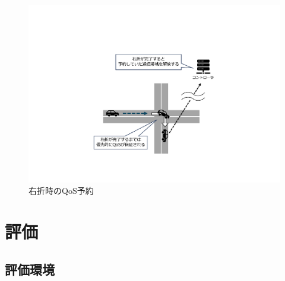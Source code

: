 \documentclass[a4paper,11pt,uplatex]{ujreport}
\begin{document}
  \begin{figure}[tb]
    \centering
    \includegraphics[width=\linewidth]{img/右折時のQoS予約2.pdf}
    \caption{右折時のQoS予約}
    \label{fig:TurnRight}
  \end{figure}







\chapter{評価}
\label{chap:評価}

\section{評価環境}
\label{評価環境}
\end{document}
